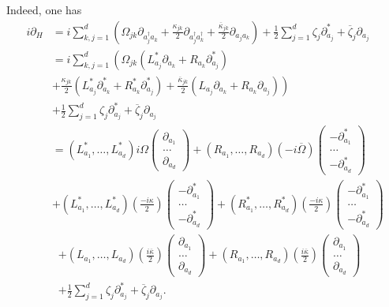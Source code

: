 \documentclass[preprint]{elsarticle}
\theoremstyle{definition}
\begin{document}
Indeed, one has
\[\begin{split}i\partial_H&=i\sum_{k,j=1}^{d} \left ( \Omega_{jk} \partial_{a^\dagger_j a_k} + \frac{\kappa_{jk}}{2}\partial_{a_j^\dagger a_k^\dagger}+\frac{\overline{\kappa}_{jk}}{2}\partial_{a_j a_k}\right )+\frac{1}{2}\sum_{j=1}^{d} \zeta_j \partial^*_{a_j} + \overline{\zeta}_j \partial_{a_j}\\
&=i\sum_{k,j=1}^{d} \left (\Omega_{jk} (L_{a_j}^*\partial_{a_k}+R_{a_k}\partial_{a_j}^*)\right .\\
&\left. + \frac{\kappa_{jk}}{2}(L_{a_j}^*\partial^*_{a_k}+R^*_{a_k}\partial_{a_j}^*)+\frac{\overline{\kappa}_{jk}}{2}(L_{a_j}\partial_{a_k}+R_{a_k}\partial_{a_j}) \right )\\
&+\frac{1}{2}\sum_{j=1}^{d} \zeta_j \partial^*_{a_j} + \overline{\zeta}_j \partial_{a_j}\\
&=(L_{a_1}^*, \dots, L_{a_d}^*)i\Omega\begin{pmatrix} \partial_{a_1}\\ \dots\\
\partial_{a_d}\end{pmatrix}+(R_{a_1}, \dots, R_{a_d})(-i\overline{\Omega})\begin{pmatrix} -\partial^*_{a_1}\\ \dots\\
-\partial^*_{a_d}\end{pmatrix}\\
&+(L_{a_1}^*, \dots, L_{a_d}^*)\left (\frac{-i\kappa}{2}\right )\begin{pmatrix} -\partial^*_{a_1}\\ \dots\\
-\partial^*_{a_d}\end{pmatrix}+(R_{a_1}^*, \dots, R_{a_d}^*)\left (\frac{-i\kappa}{2}\right )\begin{pmatrix} -\partial^*_{a_1}\\ \dots\\
-\partial^*_{a_d}\end{pmatrix}
\end{split}\]
\[\begin{split}
&+(L_{a_1}, \dots, L_{a_d})\left (\frac{i\overline{\kappa}}{2}\right )\begin{pmatrix} \partial_{a_1}\\ \dots\\
\partial_{a_d}\end{pmatrix}+(R_{a_1}, \dots, R_{a_d})\left (\frac{i\overline{\kappa}}{2}\right )\begin{pmatrix} \partial_{a_1}\\ \dots\\
\partial_{a_d}\end{pmatrix}\\
&+\frac{1}{2}\sum_{j=1}^{d} \zeta_j \partial^*_{a_j} + \overline{\zeta}_j \partial_{a_j}.\end{split}\]
\end{document}
